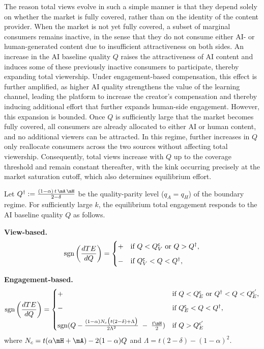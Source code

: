 The reason total views evolve in such a simple manner is that they depend solely on whether the market is fully covered, rather than on the identity of the content provider. When the market is not yet fully covered, a subset of marginal consumers remains inactive, in the sense that they do not consume either AI- or human-generated content due to insufficient attractiveness on both sides. An increase in the AI baseline quality $Q$ raises the attractiveness of AI content and induces some of these previously inactive consumers to participate, thereby expanding total viewership. Under engagement-based compensation, this effect is further amplified, as higher AI quality strengthens the value of the learning channel, leading the platform to increase the creator’s compensation and thereby inducing additional effort that further expands human-side engagement. However, this expansion is bounded. Once $Q$ is sufficiently large that the market becomes fully covered, all consumers are already allocated to either AI or human content, and no additional viewers can be attracted. In this regime, further increases in $Q$ only reallocate consumers across the two sources without affecting total viewership. Consequently, total views increase with $Q$ up to the coverage threshold and remain constant thereafter, with the kink occurring precisely at the market saturation cutoff, which also determines equilibrium effort.

\begin{corollary}\label{cor:Q_TE}
Let
$Q^{\dagger}:=\frac{(1-\alpha)\,t\,\mA\,\mH}{2-\delta}$ be the quality-parity level
($q_A=q_H$) of the boundary regime. For sufficiently large $k$, the equilibrium total engagement responds to the AI baseline quality $Q$ as follows.

\textbf{View-based.} 
\[
\operatorname{sgn}\left(\frac{dTE}{dQ}\right)=
\begin{cases}
+
 & \text{if } Q<Q^{\sf c}_V \text{ or } Q>Q^{\dagger},\\[6pt]
-
 & \text{if } Q^{\sf c}_V< Q < Q^{\dagger},
\end{cases}
\]

\textbf{Engagement-based.} 
\[
\operatorname{sgn}\left(\frac{dTE}{dQ}\right)=
\begin{cases}
+
 & \text{if } Q<Q^{\sf c}_E \text{ or } Q^{\dagger}<Q<Q_E^{\sf c'},\\[6pt]
-
 & \text{if }Q^{\sf c}_E < Q < Q^{\dagger},\\[6pt]
 \operatorname{sgn}(Q - \frac{(1-\alpha)N_c\big(t(2-\delta)+\Lambda\big)}{2\Lambda^2} \;-\; \frac{t\mH}{2}) & \text{if }Q>Q_E^{\sf c'}
\end{cases}
\]
    where $N_c = t(\alpha\mH + \mA) - 2(1-\alpha)Q$ and
    $\Lambda = t(2-\delta) - (1-\alpha)^2$.
\end{corollary}

